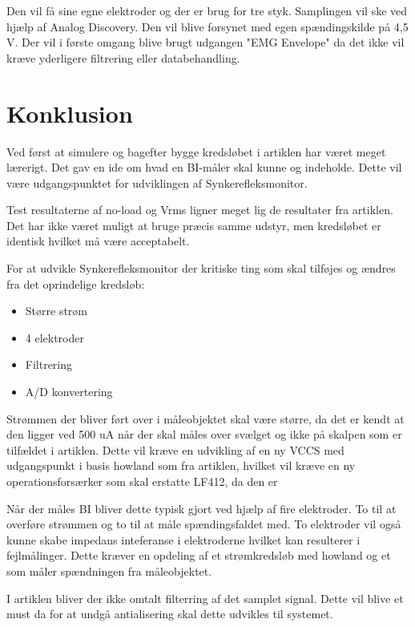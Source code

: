 Den vil få sine egne elektroder og der er brug for tre styk. Samplingen vil ske ved hjælp af Analog Discovery. Den vil blive forsynet med egen spændingskilde på 4,5 V. Der vil i første omgang blive brugt udgangen "EMG Envelope" da det ikke vil kræve yderligere filtrering eller databehandling.
 



\chapter{Konklusion}

Ved først at simulere og bagefter bygge kredsløbet i artiklen har været meget lærerigt. Det gav en ide om hvad en BI-måler skal kunne og indeholde. Dette vil være udgangspunktet for udviklingen af Synkerefleksmonitor.  

Test resultaterne af no-load og Vrms ligner meget lig de resultater fra artiklen. Det har ikke været muligt at bruge præcis samme udstyr, men kredsløbet er identisk hvilket må være acceptabelt.

For at udvikle Synkerefleksmonitor der kritiske ting som skal tilføjes og ændres fra det oprindelige kredsløb:
\begin{itemize}
\item Større strøm
\item 4 elektroder
\item Filtrering
\item A/D konvertering
\end{itemize}

Strømmen der bliver ført over i måleobjektet skal være større, da det er kendt at den ligger ved 500 uA\cite{Kusuhara2004} når der skal måles over svælget og ikke på skalpen som er tilfældet i artiklen. Dette vil kræve en udvikling af en ny VCCS med udgangspunkt i basis howland som fra artiklen, hvilket vil kræve en ny operationsforsærker som skal erstatte LF412, da den er  

Når der måles BI bliver dette typisk gjort ved hjælp af fire elektroder\cite{Brantlov2017}. To til at overføre strømmen og to til at måle spændingsfaldet med. To elektroder vil også kunne skabe impedans inteferanse i elektroderne hvilket kan resulterer i fejlmålinger. Dette kræver en opdeling af et strømkredsløb med howland og et som måler spændningen fra måleobjektet.

I artiklen bliver der ikke omtalt filterring af det samplet signal. Dette vil blive et must da for at undgå antialisering\cite{Thomas2011} skal dette udvikles til systemet.


